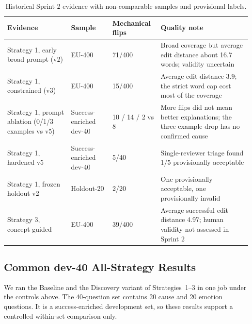 \documentclass[11pt,a4paper]{article}
\begin{document}
\begin{table}[htbp]
\centering
\small
\begin{tabularx}{\textwidth}{@{}L{3.4cm}L{2.8cm}L{2.2cm}Y@{}}
\toprule
\textbf{Evidence} & \textbf{Sample} & \textbf{Mechanical flips} & \textbf{Quality note} \\
\midrule
Strategy 1, early broad prompt (v2) & EU-400 & 71/400 & Broad coverage but average edit distance about 16.7 words; validity uncertain \\
Strategy 1, constrained (v3) & EU-400 & 15/400 & Average edit distance 3.9; the strict word cap cost most of the coverage \\
Strategy 1, prompt ablation (0/1/3 examples vs v5) & Success-enriched dev-40 & 10 / 14 / 2 vs 8 & More flips did not mean better explanations; the three-example drop has no confirmed cause \\
Strategy 1, hardened v5 & Success-enriched dev-40 & 5/40 & Single-reviewer triage found 1/5 provisionally acceptable \\
Strategy 1, frozen holdout v2 & Holdout-20 & 2/20 & One provisionally acceptable, one provisionally invalid \\
Strategy 3, concept-guided & EU-400 & 39/400 & Average successful edit distance 4.97; human validity not assessed in Sprint 2 \\
\bottomrule
\end{tabularx}
\caption{Historical Sprint 2 evidence with non-comparable samples and provisional labels.}
\label{tab:prelim}
\end{table}

\subsection{Common dev-40 All-Strategy Results}
\label{sec:commonmatrix}

We ran the Baseline and the Discovery variant of Strategies~1--3 in one job under the
controls above. The 40-question set contains 20 cause and 20 emotion questions. It is
a success-enriched development set, so these results support a controlled within-set
comparison only.
\end{document}
